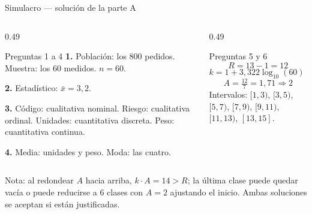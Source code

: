 \documentclass[aspectratio=169,10pt]{beamer}
\begin{document}
\begin{frame}{Simulacro — solución de la parte A}
  \scriptsize
  \begin{columns}[T,onlytextwidth]
    \begin{column}{0.49\textwidth}
      \begin{block}{Preguntas 1 a 4}
        \scriptsize
        \textbf{1.} Población: los 800 pedidos. Muestra: los 60 medidos.
        $n = 60$.

        \textbf{2.} Estadístico: $\bar{x} = 3{,}2$.

        \textbf{3.} Código: cualitativa nominal. Riesgo: cualitativa ordinal.
        Unidades: cuantitativa discreta. Peso: cuantitativa continua.

        \textbf{4.} Media: unidades y peso. Moda: las cuatro.
      \end{block}
    \end{column}
    \begin{column}{0.49\textwidth}
      \begin{exampleblock}{Preguntas 5 y 6}
        \scriptsize
        \[ R = 13-1 = 12 \]
        \[ k = 1+3{,}322\log_{10}(60) = 1+5{,}91 = 6{,}91 \Rightarrow 7 \]
        \[ A = \tfrac{12}{7} = 1{,}71 \Rightarrow 2 \]
        Intervalos: $[1,3)$, $[3,5)$, $[5,7)$, $[7,9)$, $[9,11)$, $[11,13)$,
        $[13,15]$.
      \end{exampleblock}
    \end{column}
  \end{columns}

  \vspace{0.05cm}
  {\tiny\color{uniGris} Nota: al redondear $A$ hacia arriba, $k\cdot A = 14 > R$;
  la última clase puede quedar vacía o puede reducirse a 6 clases con $A=2$
  ajustando el inicio. Ambas soluciones se aceptan si están justificadas.}
\end{frame}
\end{document}
